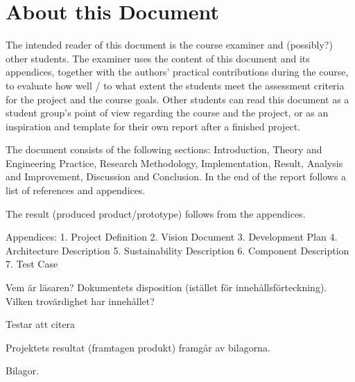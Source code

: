 \section{About this Document}
The intended reader of this document is the course examiner and (possibly?) other students. The examiner uses the content of this document and its appendices, together with the authors' practical contributions during the course, to evaluate how well / to what extent the students meet the assessment criteria for the project and the course goals. Other students can read this document as a student group's point of view regarding the course and the project, or as an inspiration and template for their own report after a finished project. 

The document consists of the following sections: Introduction, Theory and Engineering Practice, Research Methodology, Implementation, Result, Analysis and Improvement, Discussion and Conclusion. In the end of the report follows a list of references and appendices. 

The result (produced product/prototype) follows from the appendices. 

Appendices: 
1. Project Definition 
2. Vision Document 
3. Development Plan
4. Architecture Description
5. Sustainability Description 
6. Component Description 
7. Test Case 



Vem är läsaren? Dokumentets disposition (istället för innehållsförteckning). Vilken trovärdighet har innehållet?

Testar att citera \cite{eklund_arbeta_2010}

Projektets resultat (framtagen produkt) framgår av bilagorna.

Bilagor.
